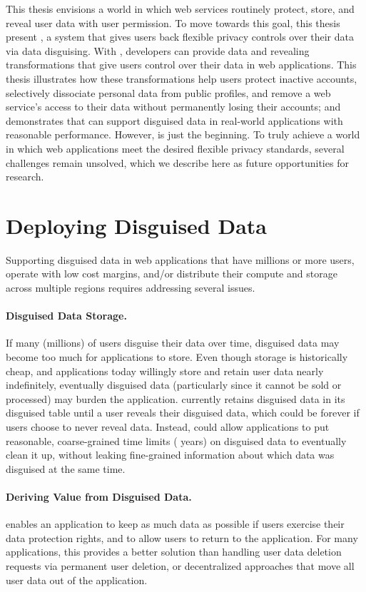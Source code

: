 This thesis envisions a world in which web services routinely
protect, store, and reveal \xxed user data with user permission.
%
To move towards this goal, this thesis present \sys, a system that gives users back
flexible privacy controls over their data via data disguising.
%
With \sys, developers can provide data \xxing and revealing transformations that
give users control over their data in web applications.
%
This thesis illustrates how these transformations help users protect
inactive accounts, selectively dissociate personal data from public profiles,
and remove a web service's access to their data without permanently losing their
accounts;
%
and demonstrates that \sys can support disguised data in real-world applications with
reasonable performance.
%
However, \sys is just the beginning. To truly achieve a world in which web
applications meet the desired flexible privacy standards, several
challenges remain unsolved, which we describe here as future
opportunities for research.
%

\section{Deploying Disguised Data}

Supporting disguised data in web applications that have millions or more users,
operate with low cost margins, and/or distribute their compute and storage
across multiple regions requires addressing several issues.

%
\paragraph{Disguised Data Storage.} If many (\eg millions) of users disguise
their data over time, disguised data may become too much for applications to
store.
%
Even though storage is historically cheap, and applications today willingly
store and retain user data nearly indefinitely, eventually disguised data
(particularly since it cannot be sold or processed) may burden the application.
%
\sys currently retains disguised data in its disguised table until a user
reveals their disguised data, which could be forever if users choose to never
reveal data.
%
Instead, \sys could allow applications to put reasonable, coarse-grained time
limits ( years) on disguised data to eventually clean it up, without
leaking fine-grained information about which data was disguised at the same
time.
%

%
\paragraph{Deriving Value from Disguised Data.} 
\sys enables an application to keep as much data as possible if users exercise
their data protection rights, and to allow users to return to the application.
For many applications, this provides a better solution than handling user data
deletion requests via permanent user deletion, or decentralized approaches that
move all user data out of the application.

